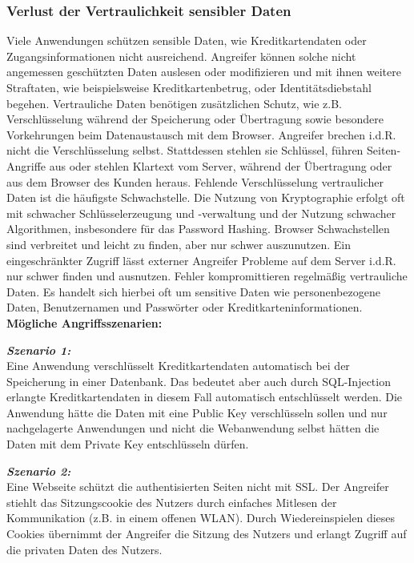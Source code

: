 \subsubsection{Verlust der Vertraulichkeit sensibler Daten}

Viele Anwendungen schützen sensible Daten, wie Kreditkartendaten oder Zugangsinformationen nicht ausreichend. Angreifer können solche nicht angemessen geschützten Daten auslesen oder modifizieren und mit ihnen weitere Straftaten, wie beispielsweise Kreditkartenbetrug, oder Identitätsdiebstahl begehen. Vertrauliche Daten benötigen zusätzlichen Schutz, wie z.B. Verschlüsselung während der Speicherung oder Übertragung sowie besondere Vorkehrungen beim Datenaustausch mit dem Browser\cite[6]{owasp17top10}. Angreifer brechen i.d.R. nicht die Verschlüsselung selbst. Stattdessen stehlen sie Schlüssel, führen
Seiten-Angriffe aus oder stehlen Klartext vom Server, während der Übertragung oder aus dem Browser des Kunden heraus. Fehlende Verschlüsselung vertraulicher
Daten ist die häufigste Schwachstelle. Die Nutzung von Kryptographie erfolgt oft mit schwacher Schlüsselerzeugung und -verwaltung und der Nutzung schwacher Algorithmen, insbesondere für das Password Hashing. Browser Schwachstellen sind verbreitet und leicht zu finden, aber nur schwer auszunutzen. Ein eingeschränkter Zugriff lässt externer Angreifer Probleme auf dem Server i.d.R. nur schwer finden und ausnutzen. Fehler kompromittieren regelmäßig vertrauliche Daten. Es handelt sich hierbei oft um sensitive Daten wie personenbezogene Daten, Benutzernamen und Passwörter oder Kreditkarteninformationen\cite[9]{owasp17top10}.\\

\textbf{Mögliche Angriffsszenarien:}

\textbf{\textit{Szenario 1:}}\\
Eine Anwendung verschlüsselt Kreditkartendaten
automatisch bei der Speicherung in einer Datenbank. Das
bedeutet aber auch durch SQL-Injection erlangte Kreditkartendaten
in diesem Fall automatisch entschlüsselt werden.
Die Anwendung hätte die Daten mit eine Public Key
verschlüsseln sollen und nur nachgelagerte Anwendungen
und nicht die Webanwendung selbst hätten die Daten mit
dem Private Key entschlüsseln dürfen\cite[9]{owasp17top10}.

\textbf{\textit{Szenario 2:}}\\
Eine Webseite schützt die authentisierten Seiten
nicht mit SSL. Der Angreifer stiehlt das Sitzungscookie des
Nutzers durch einfaches Mitlesen der Kommunikation (z.B. in
einem offenen WLAN). Durch Wiedereinspielen dieses
Cookies übernimmt der Angreifer die Sitzung des Nutzers und
erlangt Zugriff auf die privaten Daten des Nutzers\cite[9]{owasp17top10}.

